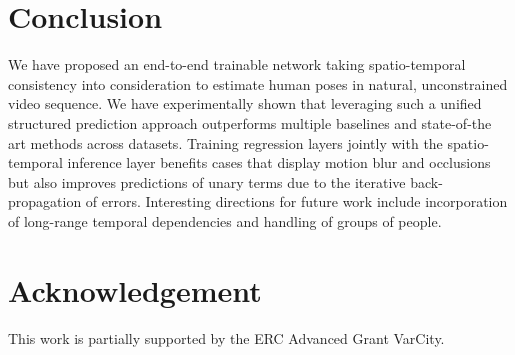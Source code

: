 \documentclass[10pt,twocolumn,letterpaper]{article}
\begin{document}


\section{Conclusion}\label{sec:conclusion}
We have proposed an end-to-end trainable network taking spatio-temporal consistency into consideration to estimate human poses in natural, unconstrained video sequence. We have experimentally shown that leveraging such a unified structured prediction approach outperforms multiple baselines and state-of-the art methods across datasets. Training regression layers jointly with the spatio-temporal inference layer benefits cases that display motion blur and occlusions but also improves predictions of unary terms due to the iterative back-propagation of errors. Interesting directions for future work include incorporation of long-range temporal dependencies and handling of groups of people.

\section*{Acknowledgement}
This work is partially supported by the ERC Advanced Grant VarCity.





{\small


}
\end{document}
